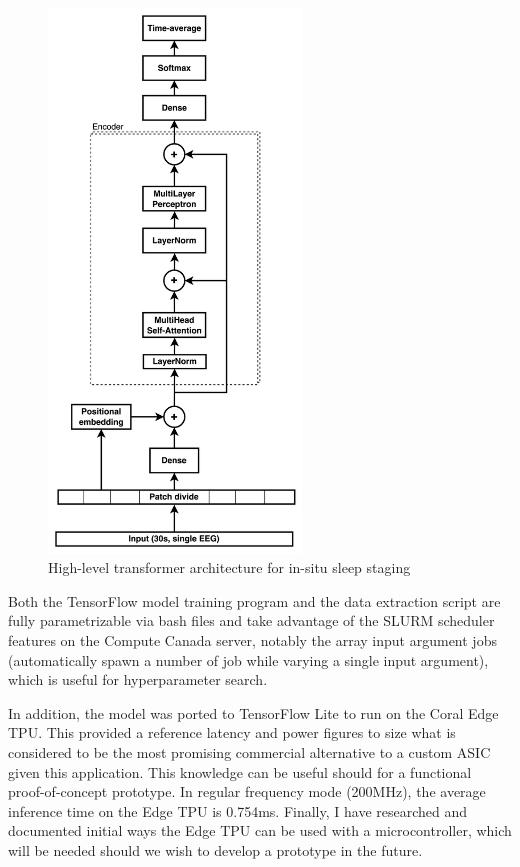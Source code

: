\documentclass[12pt, hidelinks]{article}
\begin{document}
    \begin{figure}
        \centering
        \includegraphics[width=0.6\textwidth]{assets/vit.png}
        \caption{High-level transformer architecture for in-situ sleep staging}
        \label{fig:vit}
    \end{figure}
    
    Both the TensorFlow model training program and the data extraction script are fully parametrizable via bash files and take advantage of the SLURM scheduler features on the Compute Canada server, notably the array input argument jobs (automatically spawn a number of job while
    varying a single input argument), which is useful for hyperparameter search.

    In addition, the model was ported to TensorFlow Lite to run on the Coral Edge TPU. This provided a reference latency and power figures to size what is considered to be the most promising commercial alternative to a custom ASIC given this application. This knowledge can be
    useful should for a functional proof-of-concept prototype. In regular frequency mode (200MHz), the average inference time on the Edge TPU is 0.754ms. Finally, I have researched and documented initial ways the Edge TPU can be used with a microcontroller, which will be needed
    should we wish to develop a prototype in the future.
\end{document}
